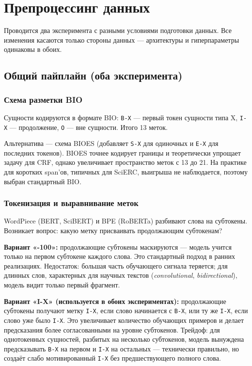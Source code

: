 \section{Препроцессинг данных}

Проводится два эксперимента с разными условиями подготовки данных. Все изменения касаются только стороны данных — архитектуры и гиперпараметры одинаковы в обоих.

\subsection{Общий пайплайн (оба эксперимента)}

\subsubsection{Схема разметки BIO}

Сущности кодируются в формате BIO: \texttt{B-X} --- первый токен сущности типа X, \texttt{I-X} --- продолжение, \texttt{O} --- вне сущности. Итого 13 меток.

Альтернатива --- схема BIOES (добавляет \texttt{S-X} для одиночных и \texttt{E-X} для последних токенов). BIOES точнее кодирует границы и теоретически упрощает задачу для CRF, однако увеличивает пространство меток с 13 до 21. На практике для коротких span'ов, типичных для SciERC, выигрыша не наблюдается, поэтому выбран стандартный BIO.

\subsubsection{Токенизация и выравнивание меток}

WordPiece (BERT, SciBERT) и BPE (RoBERTa) разбивают слова на субтокены. Возникает вопрос: какую метку присваивать продолжающим субтокенам?

\textbf{Вариант «-100»:} продолжающие субтокены маскируются --- модель учится только на первом субтокене каждого слова. Это стандартный подход в ранних реализациях. Недостаток: большая часть обучающего сигнала теряется; для длинных слов, характерных для научных текстов (\textit{convolutional}, \textit{bidirectional}), модель видит только первый фрагмент.

\textbf{Вариант «I-X» (используется в обоих экспериментах):} продолжающие субтокены получают метку \texttt{I-X}, если слово начинается с \texttt{B-X}, или ту же \texttt{I-X}, если слово уже было \texttt{I-X}. Это увеличивает количество обучающих примеров и делает предсказания более согласованными на уровне субтокенов. Трейдоф: для однотокенных сущностей, разбитых на несколько субтокенов, модель вынуждена предсказывать \texttt{B-X} на первом и \texttt{I-X} на остальных --- технически правильно, но создаёт слабо мотивированный \texttt{I-X} без предшествующего полного слова.

